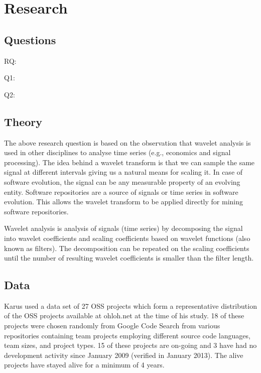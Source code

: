 \section{Research}

\subsection{Questions}

\begin{description}
	\item[RQ:] \emph{\researchQuestion}
	\item[Q1:] \emph{\subQuestionOne}
	\item[Q2:] \emph{\subQuestionTwo}
\end{description}

\subsection{Theory}
The above research question is based on the observation that wavelet analysis is
used in other disciplines to analyse time series (e.g., economics and signal
processing). The idea behind a wavelet transform is that we can sample the same
signal at different intervals giving us a natural means for scaling it. In case
of software evolution, the signal can be any measurable property of an evolving
entity. Software repositories are a source of signals or time series in software
evolution. This allows the wavelet transform to be applied directly for mining
software repositories.

Wavelet analysis is analysis of signals (time series) by decomposing the signal
into wavelet coefficients and scaling coefficients based on wavelet functions
(also known as filters). The decomposition can be repeated on the scaling
coefficients until the number of resulting wavelet coefficients is smaller than
the filter length.

\subsection{Data}
Karus used a data set of 27 OSS projects which form a representative
distribution of the OSS projects available at ohloh.net at the time of his
study. 18 of these projects were chosen randomly from Google Code Search from
various repositories containing team projects employing different source code
languages, team sizes, and project types. 15 of these projects are on-going and
3 have had no development activity since January 2009 (verified in January
2013). The alive projects have stayed alive for a minimum of 4 years.

